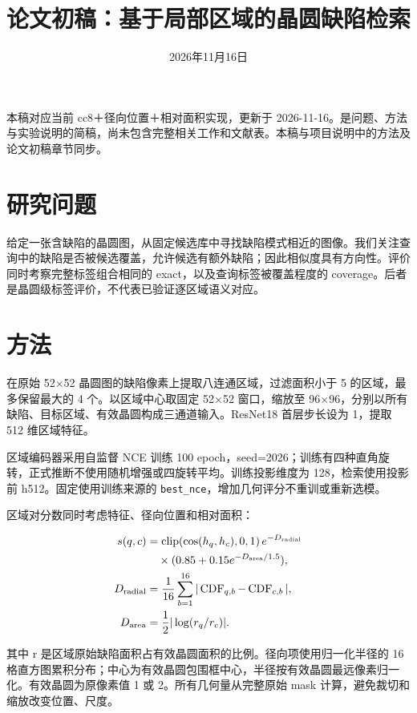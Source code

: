 \documentclass[UTF8,a4paper,11pt,fontset=fandol]{ctexart}
\title{论文初稿：基于局部区域的晶圆缺陷检索}
\author{}
\date{2026年11月16日}
\begin{document}
\maketitle


本稿对应当前 cc8＋径向位置＋相对面积实现，更新于 2026-11-16。是问题、方法与实验说明的简稿，尚未包含完整相关工作和文献表。本稿与项目说明中的方法及论文初稿章节同步。

\section{研究问题}

给定一张含缺陷的晶圆图，从固定候选库中寻找缺陷模式相近的图像。我们关注查询中的缺陷是否被候选覆盖，允许候选有额外缺陷；因此相似度具有方向性。评价同时考察完整标签组合相同的 exact，以及查询标签被覆盖程度的 coverage。后者是晶圆级标签评价，不代表已验证逐区域语义对应。

\section{方法}

在原始 52\(\times\)52 晶圆图的缺陷像素上提取八连通区域，过滤面积小于 5 的区域，最多保留最大的 4 个。以区域中心取固定 52\(\times\)52 窗口，缩放至 96\(\times\)96，分别以所有缺陷、目标区域、有效晶圆构成三通道输入。ResNet18 首层步长设为 1，提取 512 维区域特征。

区域编码器采用自监督 NCE 训练 100 epoch，seed=2026；训练有四种直角旋转，正式推断不使用随机增强或四旋转平均。训练投影维度为 128，检索使用投影前 h512。固定使用训练来源的 \texttt{best\_nce}，增加几何评分不重训或重新选模。

区域对分数同时考虑特征、径向位置和相对面积：

\begin{align*}
s(q,c) &= \operatorname{clip}(\cos(h_q,h_c),0,1)\, e^{-D_{\rm radial}} \\
&\quad\times (0.85+0.15e^{-D_{\rm area}/1.5}), \\
D_{\rm radial} &= \frac{1}{16}\sum_{b=1}^{16}|\operatorname{CDF}_{q,b}-\operatorname{CDF}_{c,b}|, \\
D_{\rm area} &= \frac12 |\log(r_q/r_c)|.
\end{align*}

其中 r 是区域原始缺陷面积占有效晶圆面积的比例。径向项使用归一化半径的 16 格直方图累积分布；中心为有效晶圆包围框中心，半径按有效晶圆最远像素归一化。有效晶圆为原像素值 1 或 2。所有几何量从完整原始 mask 计算，避免裁切和缩放改变位置、尺度。
\end{document}
